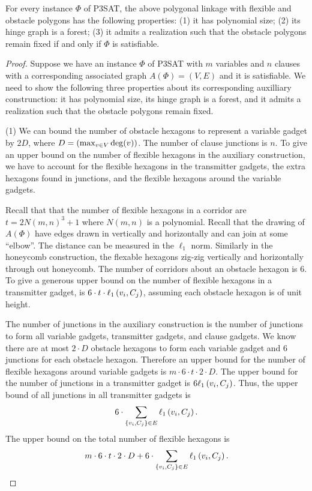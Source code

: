 \begin{lem}\label{lem:aux}
For every instance $\Phi$ of P3SAT, the above polygonal linkage with flexible and obstacle polygons has the following properties: (1) it has polynomial size; (2) its hinge graph is a forest;
(3) it admits a realization such that the obstacle polygons remain fixed if and only if $\Phi$ is satisfiable.
\end{lem}
\begin{proof}

Suppose we have an instance $\Phi$ of P3SAT with $m$ variables and $n$ clauses with a corresponding associated graph $A(\Phi)=(V,E)$ and it is satisfiable.  
We need to show the following three properties about its corresponding auxilliary construnction: it has polynomial size, its hinge graph is a forest, and it admits a realization such that the obstacle polygons remain fixed.

\noindent (1) We can bound the number of obstacle hexagons to represent a variable gadget by $2 D$, where $D = \left(  \max_{v \in V} \deg (v) \right)$.  
The number of clause junctions is $n$.
To give an upper bound on the number of flexible hexagons in the auxiliary construction, we have to account for the flexible hexagons in the transmitter gadgets, the extra hexagons found in junctions, and the flexible hexagons around the variable gadgets.

Recall that that the number of flexible hexagons in a corridor are $ t = 2N(m,n)^3 + 1 $ where $N(m,n)$ is a polynomial. 
Recall that the drawing of $A(\Phi)$ have edges drawn in vertically and horizontally and can join at some ``elbow''.  
The distance can be measured in the $\ell_1$ norm.
Similarly in the honeycomb construction, the flexable hexagons zig-zig vertically and horizontally through out honeycomb.  
The number of corridors about an obstacle hexagon is $6$.
To give a generous upper bound on the number of flexible hexagons in a transmitter gadget, is $6 \cdot t \cdot \ell_1\left( v_i,C_j \right)$, assuming each obstacle hexagon is of unit height.

The number of junctions in the auxiliary construction is the number of junctions to form all variable gadgets, transmitter gadgets, and clause gadgets. 
We know there are at most $2 \cdot D$ obstacle hexagons to form each variable gadget and $6$ junctions for each obstacle hexagon.  
Therefore an upper bound for the number of flexible hexagons around variable gadgets is $m \cdot 6 \cdot t \cdot 2 \cdot D$.
The upper bound for the number of junctions in a transmitter gadget is $6 \ell_1 \left( v_i, C_j \right)$.  
Thus, the upper bound of all junctions in all transmitter gadgets is $$6 \cdot \sum_{\left\lbrace v_i, C_j \right\rbrace \in E} \ell_1 \left( v_i, C_j \right).$$
The upper bound on the total number of flexible hexagons is
$$m \cdot 6 \cdot t \cdot 2 \cdot D + 6 \cdot \sum_{\left\lbrace v_i, C_j \right\rbrace \in E} \ell_1 \left( v_i, C_j \right).$$


\end{proof}
